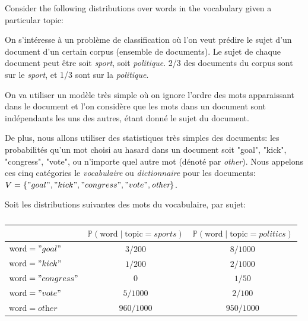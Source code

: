 \documentclass[11pt,french,english]{article}
\begin{document}
\begin{enumerate}
{Consider the following distributions over words in the vocabulary given a particular topic:
}{On s'intéresse à un problème de classification où l'on veut prédire le sujet d'un document d'un certain corpus (ensemble de documents).
Le sujet de chaque document peut être soit \textit{sport}, soit \textit{politique}. 2/3 des documents du corpus sont sur le \textit{sport}, et 1/3 sont sur la \textit{politique}. 

On va utiliser un modèle très simple où on ignore l'ordre des mots apparaissant dans le document et l'on considère que les mots dans un document sont indépendants les uns des autres, étant donné le sujet du document.

De plus, nous allons utiliser des statistiques très simples des documents: les probabilités qu'un mot choisi au hasard dans un document soit "goal", "kick", "congress", "vote", ou n'importe quel autre mot (dénoté par \textit{other}). Nous appelons ces cinq catégories le \emph{vocabulaire} ou \emph{dictionnaire} pour les documents: $V=\{"goal","kick ", "congress", "vote", \textit{other}\}$.

Soit les distributions suivantes des mots du vocabulaire, par sujet:}


\begin{center}
\begin{table}[h!]
\begin{tabular}{l|cc}
     & $\mathbb{P}(\mathrm{word} \mid \mathrm{topic}=\textit{sports})$ & $\mathbb{P}(\mathrm{word} \mid \mathrm{topic}=\textit{politics})$\\
     \hline 
$\mathrm{word} = "goal"$    & $3/200$& $8/1000$ \\
$\mathrm{word} = "kick"$    & $1/200$& $2/1000$ \\
$\mathrm{word} = "congress"$    & $0$& $1/50$ \\
$\mathrm{word} = "vote"$    & $5/1000$& $2/100$ \\
$\mathrm{word} = \textit{other}$  & $960/1000$ & $950/1000$ 
\end{tabular}
    \caption{}
    \label{tab:bow}
\end{table}
\end{center}



\end{enumerate}
\end{document}
